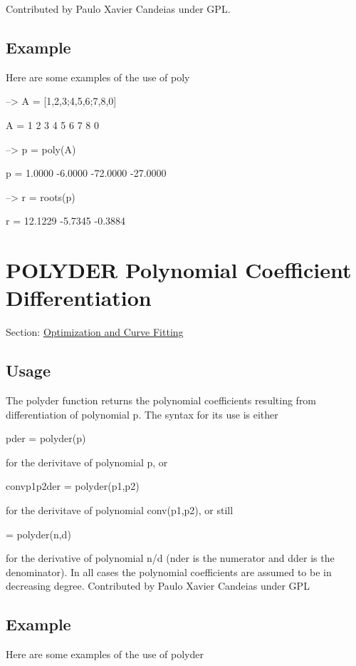 Contributed by Paulo Xavier Candeias under G\-P\-L. \hypertarget{variables_struct_Example}{}\subsection{Example}\label{variables_struct_Example}
Here are some examples of the use of {\ttfamily poly}


\begin{DoxyVerbInclude}
--> A = [1,2,3;4,5,6;7,8,0]

A = 
 1 2 3 
 4 5 6 
 7 8 0 

--> p = poly(A)

p = 
    1.0000   -6.0000  -72.0000  -27.0000 

--> r = roots(p)

r = 
   12.1229 
   -5.7345 
   -0.3884 
\end{DoxyVerbInclude}
 \hypertarget{curvefit_polyder}{}\section{P\-O\-L\-Y\-D\-E\-R Polynomial Coefficient Differentiation}\label{curvefit_polyder}
Section\-: \hyperlink{sec_curvefit}{Optimization and Curve Fitting} \hypertarget{vtkwidgets_vtkxyplotwidget_Usage}{}\subsection{Usage}\label{vtkwidgets_vtkxyplotwidget_Usage}
The {\ttfamily polyder} function returns the polynomial coefficients resulting from differentiation of polynomial {\ttfamily p}. The syntax for its use is either \begin{DoxyVerb} pder = polyder(p)
\end{DoxyVerb}
 for the derivitave of polynomial p, or \begin{DoxyVerb} convp1p2der = polyder(p1,p2)
\end{DoxyVerb}
 for the derivitave of polynomial conv(p1,p2), or still \begin{DoxyVerb}  = polyder(n,d)
\end{DoxyVerb}
 for the derivative of polynomial {\ttfamily n/d} ({\ttfamily nder} is the numerator and {\ttfamily dder} is the denominator). In all cases the polynomial coefficients are assumed to be in decreasing degree. Contributed by Paulo Xavier Candeias under G\-P\-L \hypertarget{variables_struct_Example}{}\subsection{Example}\label{variables_struct_Example}
Here are some examples of the use of {\ttfamily polyder}


